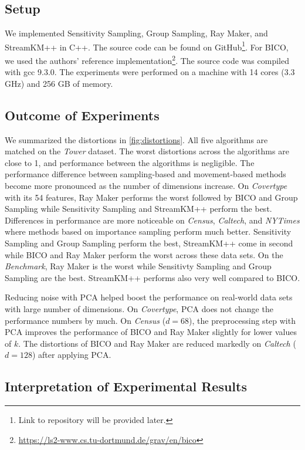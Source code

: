 \subsection{Setup}
We implemented Sensitivity Sampling, Group Sampling, Ray Maker, and StreamKM++ in C++. The source code can be found on GitHub\footnote{Link to repository will be provided later.}. For BICO, we used the authors' reference implementation\footnote{\url{https://ls2-www.cs.tu-dortmund.de/grav/en/bico}}. The source code was compiled with gcc 9.3.0. The experiments were performed on a machine with 14 cores (3.3 GHz) and 256 GB of memory.



\subsection{Outcome of Experiments}
We summarized the distortions in \cref{fig:distortions}.
All five algorithms are matched on the \textit{Tower} dataset. The worst distortions across the algorithms are close to 1, and performance between the algorithms is negligible. The performance difference between sampling-based and movement-based methods become more pronounced as the number of dimensions increase. On \textit{Covertype} with its 54 features, Ray Maker performs the worst followed by BICO and Group Sampling while Sensitivity Sampling and StreamKM++ perform the best. Differences in performance are more noticeable on \textit{Census}, \textit{Caltech}, and \textit{NYTimes}  where methods based on importance sampling perform much better. Sensitivity Sampling and Group Sampling perform the best, StreamKM++ come in second while BICO and Ray Maker perform the worst across these data sets.
On the \textit{Benchmark}, Ray Maker is the worst while Sensitivty Sampling and Group Sampling are the best. StreamKM++ performs also very well compared to BICO.

Reducing noise with PCA helped boost the performance on real-world data sets with large number of dimensions. On \textit{Covertype}, PCA does not change the performance numbers by much. On \textit{Census} ($d=68$), the preprocessing step with PCA improves the performance of BICO and Ray Maker slightly for lower values of $k$. The distortions of BICO and Ray Maker are reduced markedly on \textit{Caltech} ($d=128$) after applying PCA. 


\subsection{Interpretation of Experimental Results}


